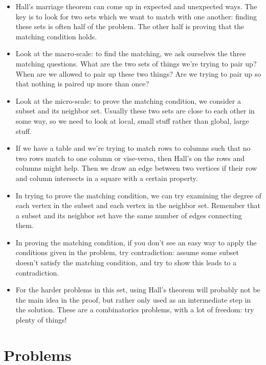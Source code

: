 \documentclass[11pt,paper=letter]{scrartcl}
\begin{document}
\begin{itemize}

\item Hall's marriage theorem can come up in expected and unexpected ways. The key is to look for two sets which we want to match with one another: finding these sets is often half of the problem. The other half is proving that the matching condition holds.

\item Look at the macro-scale: to find the matching, we ask ourselves the three matching questions. What are the two sets of things we're trying to pair up? When are we allowed to pair up these two things? Are we trying to pair up so that nothing is paired up more than once?

\item Look at the micro-scale: to prove the matching condition, we consider a subset and its neighbor set. Usually these two sets are close to each other in some way, so we need to look at local, small stuff rather than global, large stuff.

\item If we have a table and we're trying to match rows to columns such that no two rows match to one column or vise-versa, then Hall's on the rows and columns might help. Then we draw an edge between two vertices if their row and column intersects in a square with a certain property.

\item In trying to prove the matching condition, we can try examining the degree of each vertex in the subset and each vertex in the neighbor set. Remember that a subset and its neighbor set have the same number of edges connecting them.

\item In proving the matching condition, if you don't see an easy way to apply the conditions given in the problem, try contradiction: assume some subset doesn't satisfy the matching condition, and try to show this leads to a contradiction.

\item For the harder problems in this set, using Hall's theorem will probably not be the main idea in the proof, but rather only used as an intermediate step in the solution. These are a combinatorics problems, with a lot of freedom: try plenty of things!

\end{itemize}

\section{Problems}
\end{document}
